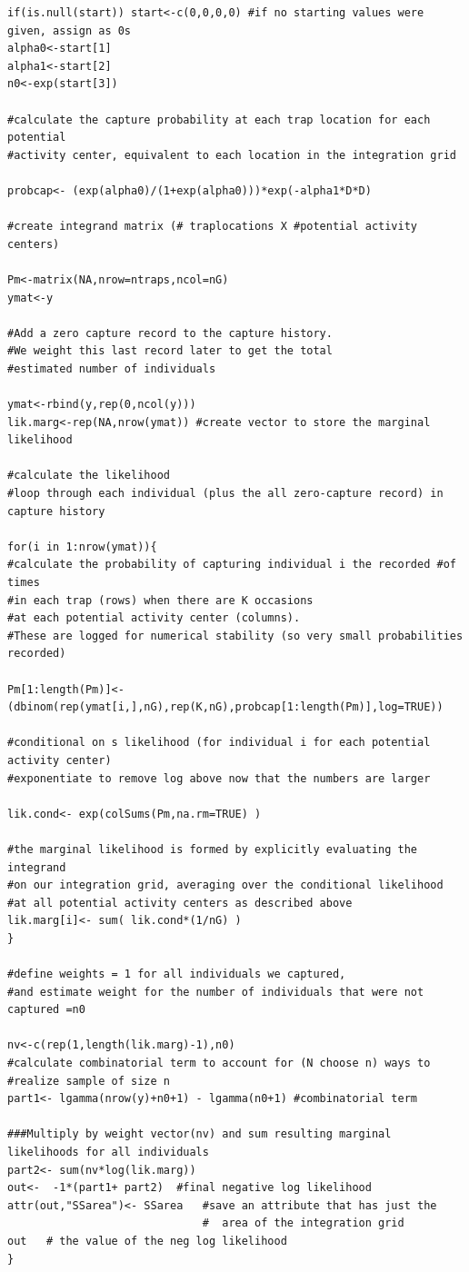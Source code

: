 \documentclass[12pt]{article}
\begin{document}
\begin{spacing}{1.2}
{\begin{verbatim}
if(is.null(start)) start<-c(0,0,0,0) #if no starting values were given, assign as 0s
alpha0<-start[1]
alpha1<-start[2]
n0<-exp(start[3])

#calculate the capture probability at each trap location for each potential 
#activity center, equivalent to each location in the integration grid

probcap<- (exp(alpha0)/(1+exp(alpha0)))*exp(-alpha1*D*D) 

#create integrand matrix (# traplocations X #potential activity centers)

Pm<-matrix(NA,nrow=ntraps,ncol=nG) 
ymat<-y

#Add a zero capture record to the capture history. 
#We weight this last record later to get the total
#estimated number of individuals

ymat<-rbind(y,rep(0,ncol(y)))  
lik.marg<-rep(NA,nrow(ymat)) #create vector to store the marginal likelihood

#calculate the likelihood  
#loop through each individual (plus the all zero-capture record) in capture history

for(i in 1:nrow(ymat)){ 
#calculate the probability of capturing individual i the recorded #of times 
#in each trap (rows) when there are K occasions 
#at each potential activity center (columns).
#These are logged for numerical stability (so very small probabilities recorded)

Pm[1:length(Pm)]<- (dbinom(rep(ymat[i,],nG),rep(K,nG),probcap[1:length(Pm)],log=TRUE))

#conditional on s likelihood (for individual i for each potential activity center)
#exponentiate to remove log above now that the numbers are larger

lik.cond<- exp(colSums(Pm,na.rm=TRUE) )

#the marginal likelihood is formed by explicitly evaluating the integrand 
#on our integration grid, averaging over the conditional likelihood 
#at all potential activity centers as described above
lik.marg[i]<- sum( lik.cond*(1/nG) )  
}      

#define weights = 1 for all individuals we captured, 
#and estimate weight for the number of individuals that were not captured =n0                 
                     
nv<-c(rep(1,length(lik.marg)-1),n0)  
#calculate combinatorial term to account for (N choose n) ways to  
#realize sample of size n
part1<- lgamma(nrow(y)+n0+1) - lgamma(n0+1) #combinatorial term  

###Multiply by weight vector(nv) and sum resulting marginal likelihoods for all individuals
part2<- sum(nv*log(lik.marg))  
out<-  -1*(part1+ part2)  #final negative log likelihood
attr(out,"SSarea")<- SSarea   #save an attribute that has just the
                              #  area of the integration grid
out   # the value of the neg log likelihood
}
\end{verbatim}
}



\end{spacing}
\end{document}

